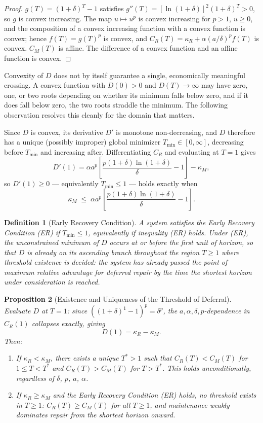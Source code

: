\documentclass[11pt]{article}
\newtheorem{definition}{Definition}[section]
\newtheorem{proposition}[definition]{Proposition}
\begin{document}
\begin{proof}
$g(T) = (1+\delta)^T - 1$ satisfies $g''(T) = [\ln(1+\delta)]^2(1+\delta)^T > 0$, so $g$ is convex increasing. The map $u \mapsto u^p$ is convex increasing for $p > 1$, $u \geq 0$, and the composition of a convex increasing function with a convex function is convex; hence $f(T) = g(T)^p$ is convex, and $C_R(T) = \kappa_R + \alpha(a/\delta)^p f(T)$ is convex. $C_M(T)$ is affine. The difference of a convex function and an affine function is convex.
\end{proof}

Convexity of $D$ does not by itself guarantee a single, economically meaningful crossing. A convex function with $D(0) > 0$ and $D(T) \to \infty$ may have zero, one, or two roots depending on whether its minimum falls below zero, and if it does fall below zero, the two roots straddle the minimum. The following observation resolves this cleanly for the domain that matters.

Since $D$ is convex, its derivative $D'$ is monotone non-decreasing, and $D$ therefore has a unique (possibly improper) global minimizer $T_{\min} \in [0,\infty]$, decreasing before $T_{\min}$ and increasing after. Differentiating $C_R$ and evaluating at $T=1$ gives
\[
D'(1) = \alpha a^p\left[\frac{p(1+\delta)\ln(1+\delta)}{\delta} - 1\right] - \kappa_M,
\]
so $D'(1) \geq 0$ — equivalently $T_{\min} \leq 1$ — holds exactly when
\[
\kappa_M \;\leq\; \alpha a^p\left[\frac{p(1+\delta)\ln(1+\delta)}{\delta} - 1\right]. \tag{ER}
\]

\begin{definition}[Early Recovery Condition]
A system satisfies the \emph{Early Recovery Condition} (ER) if $T_{\min}\leq 1$, equivalently if inequality (ER) holds. Under (ER), the unconstrained minimum of $D$ occurs at or before the first unit of horizon, so that $D$ is already on its ascending branch throughout the region $T\geq 1$ where threshold existence is decided: the system has already passed the point of maximum relative advantage for deferred repair by the time the shortest horizon under consideration is reached.
\end{definition}

\begin{proposition}[Existence and Uniqueness of the Threshold of Deferral]
\label{prop:existence}
Evaluate $D$ at $T = 1$: since $((1+\delta)^1 - 1)^p = \delta^p$, the $a, \alpha, \delta, p$-dependence in $C_R(1)$ collapses exactly, giving
\[
D(1) = \kappa_R - \kappa_M.
\]
Then:
\begin{enumerate}[label=(\roman*)]
\item If $\kappa_R < \kappa_M$, there exists a unique $T^* > 1$ such that $C_R(T) < C_M(T)$ for $1 \leq T < T^*$ and $C_R(T) > C_M(T)$ for $T > T^*$. This holds unconditionally, regardless of $\delta$, $p$, $a$, $\alpha$.
\item If $\kappa_R \geq \kappa_M$ \emph{and the Early Recovery Condition (ER) holds}, no threshold exists in $T \geq 1$: $C_R(T) \geq C_M(T)$ for all $T \geq 1$, and maintenance weakly dominates repair from the shortest horizon onward.
\end{enumerate}
\end{proposition}
\end{document}
